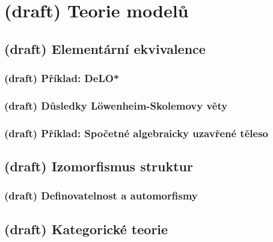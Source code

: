 \chapter{(draft) Teorie modelů}\todo




\section{(draft) Elementární ekvivalence}\todo



\subsection{(draft) Příklad: DeLO*}\todo




\subsection{(draft) Důsledky Löwenheim-Skolemovy věty}\todo



\subsection{(draft) Příklad: Spočetné algebraicky uzavřené těleso}\todo




\section{(draft) Izomorfismus struktur}\label{section:isomorphism-of-structures}\todo



\subsection{(draft) Definovatelnost a automorfismy}\todo



\section{(draft) Kategorické teorie}\todo

